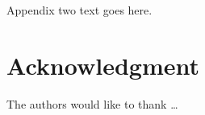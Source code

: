 \documentclass[journal,transmag]{IEEEtran}
\begin{document}
\section{}
Appendix two text goes here.


\section*{Acknowledgment}


The authors would like to thank \ldots


\ifCLASSOPTIONcaptionsoff{}
	\newpage
\fi







%



% 
\end{document}
